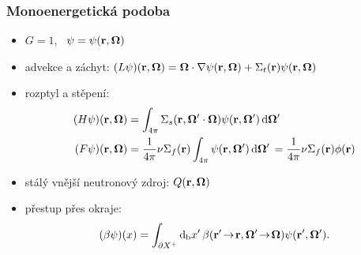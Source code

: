 \begin{frame}
  \frametitle{Monoenergetická podoba}
  
\begin{itemize}
	\item $ G = 1$,~ $\angflux = \angflux(\br,\bomega)$
	\item advekce a záchyt: $(L\angflux)(\br,\bomega) = \bomega\cdot\nabla\angflux(\br,\bomega) + \Sigma_t(\br)\angflux(\br,\bomega)$
	\item rozptyl a stěpení: 
	    \begin{align*}
		      (H\angflux)(\br,\bomega) &= \aintp{\Sigma_s(\br, \bomega'\cdot\bomega)\angflux(\br,\bomega')}\\
		      (F\angflux)(\br,\bomega) &= \frac{1}{4\pi}\nu\Sigma_f(\br)\aintp{\angflux(\br,\bomega')} = \frac{1}{4\pi}\nu\Sigma_f(\br)\fl(\br)
      \end{align*}
	\item stálý vnější neutronový zdroj: $Q(\br,\bomega)$
	\item přestup přes okraje: 
	$$
		(\beta\angflux)(x) = \bndint[']{\pX[+]}\beta(\br'\ra \br,\bomega'\ra\bomega)\angflux(\br',\bomega').
  $$
\end{itemize}

\end{frame}

